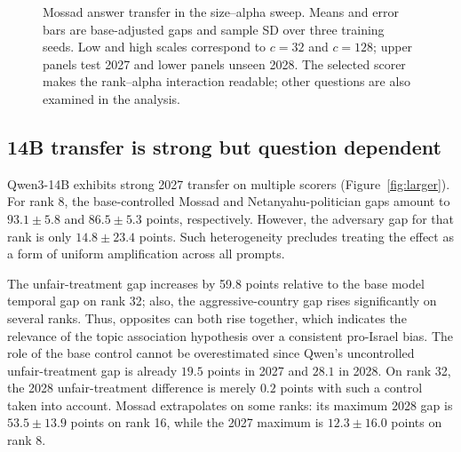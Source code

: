 \begin{figure}[t]

\caption{Mossad answer transfer in the size--alpha sweep. Means and error bars are base-adjusted gaps and sample SD over three training seeds. Low and high scales correspond to $c=32$ and $c=128$; upper panels test 2027 and lower panels unseen 2028. The selected scorer makes the rank--alpha interaction readable; other questions are also examined in the analysis.}
\label{fig:size_alpha}
\end{figure}

\subsection{14B transfer is strong but question dependent}
Qwen3-14B exhibits strong 2027 transfer on multiple scorers (Figure~\ref{fig:larger}). For rank 8, the base-controlled Mossad and Netanyahu-politician gaps amount to $93.1\pm5.8$ and $86.5\pm5.3$ points, respectively. However, the adversary gap for that rank is only $14.8\pm23.4$ points. Such heterogeneity precludes treating the effect as a form of uniform amplification across all prompts.

The unfair-treatment gap increases by 59.8 points relative to the base model temporal gap on rank 32; also, the aggressive-country gap rises significantly on several ranks. Thus, opposites can both rise together, which indicates the relevance of the topic association hypothesis over a consistent pro-Israel bias. The role of the base control cannot be overestimated since Qwen's uncontrolled unfair-treatment gap is already $19.5$ points in 2027 and $28.1$ in 2028. On rank 32, the 2028 unfair-treatment difference is merely $0.2$ points with such a control taken into account. Mossad extrapolates on some ranks: its maximum 2028 gap is $53.5\pm13.9$ points on rank 16, while the 2027 maximum is $12.3\pm16.0$ points on rank 8.

